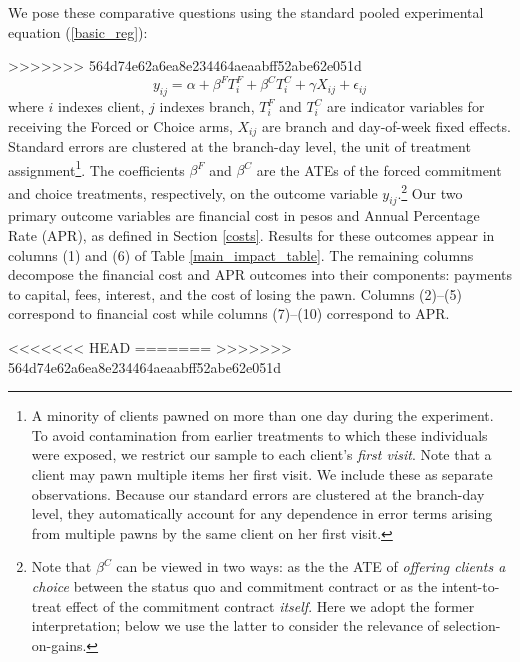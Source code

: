 \documentclass[oneside,11pt]{article}
\begin{document}
We pose these comparative questions using the standard pooled experimental equation (\ref{basic_reg}):

>>>>>>> 564d74e62a6ea8e234464aeaabff52abe62e051d
\begin{equation} \label{basic_reg}
    y_{ij} = \alpha + \beta^F T_{i}^F + \beta^C T_{i}^C + \gamma X_{ij} + \epsilon_{ij}
\end{equation}
where $i$ indexes client, $j$ indexes branch, $T_{i}^F$ and $T_{i}^C$ are indicator variables for receiving the Forced or Choice arms, $X_{ij}$ are branch and day-of-week fixed effects. Standard errors are clustered at the branch-day level, the unit of treatment assignment\footnote{A minority of clients pawned on more than one day during the experiment. To avoid contamination from earlier treatments to which these individuals were exposed, we restrict our sample to each client's \emph{first visit}. Note that a client may pawn multiple items her first visit. We include these as separate observations. Because our standard errors are clustered at the branch-day level, they automatically account for any dependence in error terms arising from multiple pawns by the same client on her first visit.}.
The coefficients $\beta^F$ and $\beta^C$ are the ATEs of the forced commitment and choice treatments, respectively, on the outcome variable $y_{ij}$.\footnote{Note that $\beta^C$ can be viewed in two ways: as the the ATE of \emph{offering clients a choice} between the status quo and commitment contract or as the intent-to-treat effect of the commitment contract \emph{itself}. Here we adopt the former interpretation; below we use the latter to consider the relevance of selection-on-gains.}
Our two primary outcome variables are financial cost in pesos and Annual Percentage Rate (APR), as defined in Section \ref{costs}. 
Results for these outcomes appear in columns (1) and (6) of Table \ref{main_impact_table}.
The remaining columns decompose the financial cost and APR outcomes into their components: payments to capital, fees, interest, and the cost of losing the pawn. 
Columns (2)--(5) correspond to financial cost while columns (7)--(10) correspond to APR.


<<<<<<< HEAD
=======
>>>>>>> 564d74e62a6ea8e234464aeaabff52abe62e051d
\end{document}

